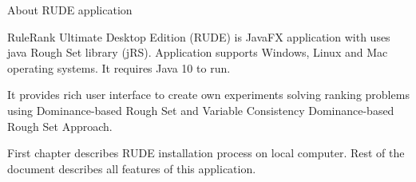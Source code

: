 \begin{Large}
	About RUDE application
\end{Large}
\newline

RuleRank Ultimate Desktop Edition (RUDE) is JavaFX application with uses java Rough Set library (jRS). Application supports Windows, Linux and Mac operating systems. It requires Java 10 to run.
\newline

It provides rich user interface to create own experiments solving ranking problems using Dominance-based Rough Set and Variable Consistency Dominance-based Rough Set Approach.
\newline

First chapter describes RUDE installation process on local computer. Rest of the document describes all features of this application.

\vfill\newpage
